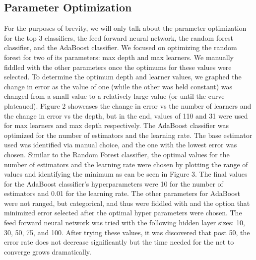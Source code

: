\documentclass{article} %
\begin{document}
\subsection{Parameter Optimization}
For the purposes of brevity, we will only talk about the parameter optimization for the top 3 classifiers, the feed forward neural network, the random forest classifier, and the AdaBoost classifier. We focused on optimizing the random forest for two of its parameters: max depth and max learners. We manually fiddled with the other parameters once the optimums for these values were selected. To determine the optimum depth and learner values, we graphed the change in error as the value of one (while the other was held constant) was changed from a small value to a relatively large value (or until the curve plateaued). Figure 2 showcases the change in error vs the number of learners and the change in error vs the depth, but in the end, values of 110 and 31 were used for max learners and max depth respectively. The AdaBoost classifier was optimized for the number of estimators and the learning rate. The base estimator used was identified via manual choice, and the one with the lowest error was chosen. Similar to the Random Forest classifier, the optimal values for the number of estimators and the learning rate were chosen by plotting the range of values and identifying the minimum as can be seen in Figure 3. The final values for the AdaBoost classifier's hyperparameters were 10 for the number of estimators and 0.01 for the learning rate. The other parameters for AdaBoost were not ranged, but categorical, and thus were fiddled with and the option that minimized error selected after the optimal hyper parameters were chosen. The feed forward neural network was tried with the following hidden layer sizes: 10, 30, 50, 75, and 100. After trying these values, it was discovered that post 50, the error rate does not decrease significantly but the time needed for the net to converge grows dramatically.
\end{document}
